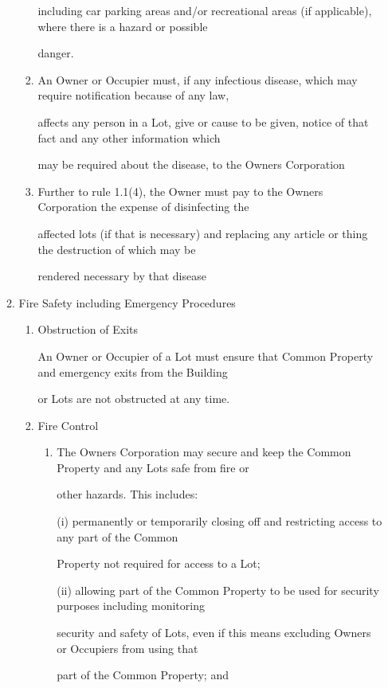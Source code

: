 \documentclass{article}
\begin{document}
\begin{enumerate}[label=\arabic*.]
\begin{enumerate}[label=\arabic{enumi}.\arabic*.]
\begin{enumerate}[label=(\arabic*)]
including car parking areas and/or recreational areas (if applicable), where there is a hazard or possible 

danger. 

\item  An Owner or Occupier must, if any infectious disease, which may require notification because of any law, 

affects any person in a Lot, give or cause to be given, notice of that fact and any other information which 

may be required about the disease, to the Owners Corporation 

\item  Further to rule 1.1(4), the Owner must pay to the Owners Corporation the expense of disinfecting the 

affected lots (if that is necessary) and replacing any article or thing the destruction of which may be 

rendered necessary by that disease 

\end{enumerate}
\item  Fire Safety including Emergency Procedures 

\begin{enumerate}[label=(\arabic*)]
\item  Obstruction of Exits 

An Owner or Occupier of a Lot must ensure that Common Property and emergency exits from the Building 

or Lots are not obstructed at any time. 

\item  Fire Control 

\begin{enumerate}[label=(\alph*)]
\item  The Owners Corporation may secure and keep the Common Property and any Lots safe from fire or 

other hazards. This includes: 

(i) permanently or temporarily closing off and restricting access to any part of the Common 

Property not required for access to a Lot; 

(ii) allowing part of the Common Property to be used for security purposes including monitoring 

security and safety of Lots, even if this means excluding Owners or Occupiers from using that 

part of the Common Property; and 


\end{enumerate}
\end{enumerate}
\end{enumerate}
\end{enumerate}
\end{document}
